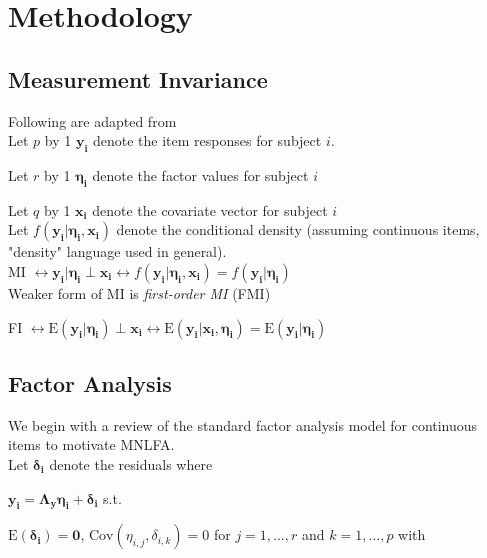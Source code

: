 \documentclass[12pt]{article}
\begin{document}
\section{Methodology}
\subsection{Measurement Invariance}
Following are adapted from \cite{bauer_2017}\\

\noindent Let $p$ by 1 $\boldsymbol{y_i}$ denote the item responses for subject $i$.

\noindent Let $r$ by 1 $\boldsymbol{\eta_i}$ denote the factor values for subject $i$

\noindent Let $q$ by 1 $\boldsymbol{x_i}$ denote the covariate vector for subject $i$\\

\noindent Let $f(\boldsymbol{y_i}|\boldsymbol{\eta_i},\boldsymbol{x_i})$ denote the conditional density (assuming continuous items, "density" language used in general).\\

\noindent MI $\leftrightarrow \boldsymbol{y_i}|\boldsymbol{\eta_i} \perp \boldsymbol{x_i} \leftrightarrow f(\boldsymbol{y_i}|\boldsymbol{\eta_i},\boldsymbol{x_i})=f(\boldsymbol{y_i}|\boldsymbol{\eta_i})$\\

\noindent Weaker form of MI is \textit{first-order MI} (FMI)

\noindent FI $\leftrightarrow \mbox{E}(\boldsymbol{y_i}|\boldsymbol{\eta_i}) \perp \boldsymbol{x_i} \leftrightarrow \mbox{E}(\boldsymbol{y_i}|\boldsymbol{x_i},\boldsymbol{\eta_i})=\mbox{E}(\boldsymbol{y_i}|\boldsymbol{\eta_i})$

\subsection{Factor Analysis}
We begin with a review of the standard factor analysis model for continuous items to motivate MNLFA.\\

\noindent Let $\boldsymbol{\delta_i}$ denote the residuals where 

\noindent $\boldsymbol{y_i}=\boldsymbol{\Lambda_y}\boldsymbol{\eta_i}+\boldsymbol{\delta_i}$ s.t. 

\noindent $\mbox{E}(\boldsymbol{\delta_i})=\boldsymbol{0}$, $\mbox{Cov}(\eta_{i,j}, \delta_{i,k})=0$ for $j=1,\ldots,r$ and $k=1,\ldots,p$ with
\end{document}
